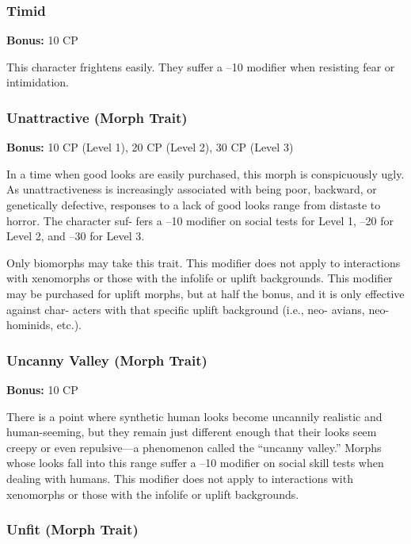 \subsubsection{Timid}

\textbf{Bonus:} 10 CP

This character frightens easily. They suffer a –10 
modifier when resisting fear or intimidation.

\subsubsection{Unattractive (Morph Trait)}

\textbf{Bonus:} 10 CP (Level 1), 20 CP (Level 2), 30 CP (Level 3)

In a time when good looks are easily purchased, 
this morph is conspicuously ugly. As unattractiveness 
is increasingly associated with being poor, backward, 
or genetically defective, responses to a lack of good 
looks range from distaste to horror. The character suf-
fers a –10 modifier on social tests for Level 1, –20 for 
Level 2, and –30 for Level 3.

Only biomorphs may take this trait. This modifier 
does not apply to interactions with xenomorphs or 
those with the infolife or uplift backgrounds. This 
modifier may be purchased for uplift morphs, but at 
half the bonus, and it is only effective against char-
acters with that specific uplift background (i.e., neo-
avians, neo-hominids, etc.).

\subsubsection{Uncanny Valley (Morph Trait)}

\textbf{Bonus:} 10 CP

There is a point where synthetic human looks 
become uncannily realistic and human-seeming, but 
they remain just different enough that their looks 
seem creepy or even repulsive—a phenomenon called 
the ``uncanny valley.'' Morphs whose looks fall into 
this range suffer a –10 modifier on social skill tests 
when dealing with humans. This modifier does not 
apply to interactions with xenomorphs or those with 
the infolife or uplift backgrounds. 

\subsubsection{Unfit (Morph Trait)}

